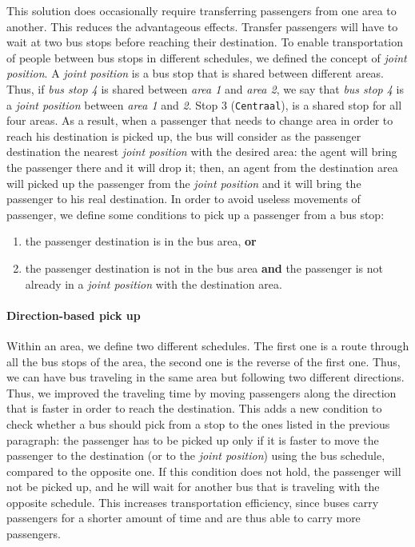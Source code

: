 This solution does occasionally require transferring passengers from one area to another. This reduces the advantageous effects. Transfer passengers will have to wait at two bus stops before reaching their destination. To enable transportation of people between bus stops in different schedules, we defined the concept of \textit{joint position}. A \textit{joint position} is a bus stop that is shared between different areas. Thus, if \textit{bus stop 4} is shared between \textit{area 1} and \textit{area 2}, we say that \textit{bus stop 4} is a \textit{joint position}  between \textit{area 1} and \textit{2}. Stop 3 (\texttt{Centraal}), is a shared stop for all four areas. As a result, when a passenger that needs to change area in order to reach his destination is picked up, the bus will consider as the passenger destination the nearest \textit{joint position} with the desired area: the agent will bring the passenger there and it will drop it; then, an agent from the destination area will picked up the passenger from the \textit{joint position} and it will bring the passenger to his real destination. In order to avoid useless movements of passenger, we define some conditions to pick up a passenger from a bus stop:

\begin{enumerate}
\item the passenger destination is in the bus area, \textbf{or}
\item the passenger destination is not in the bus area \textbf{and} the passenger is not already in a \textit{joint position} with the destination area.
\end{enumerate}

\paragraph{Direction-based pick up}

Within an area, we define two different schedules. The first one is a route through all the bus stops of the area, the second one is the reverse of the first one. Thus, we can have bus traveling in the same area but following two different directions. Thus, we improved the traveling time by moving passengers along the direction that is faster in order to reach the destination. This adds a new condition to check whether a bus should pick from a stop to the ones listed in the previous paragraph: the passenger has to be picked up only if it is faster to move the passenger to the destination (or to the \textit{joint position}) using the bus schedule, compared to the opposite one. If this condition does not hold, the passenger will not be picked up, and he will wait for another bus that is traveling with the opposite schedule. This increases transportation efficiency, since buses carry passengers for a shorter amount of time and are thus able to carry more passengers. 

